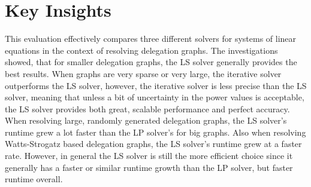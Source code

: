 \section{Key Insights}

This evaluation effectively compares three different solvers for systems of linear equations in the context of resolving delegation graphs. The investigations showed, that for smaller delegation graphs, the LS solver generally provides the best results. When graphs are very sparse or very large, the iterative solver outperforms the LS solver, however, the iterative solver is less precise than the LS solver, meaning that unless a bit of uncertainty in the power values is acceptable, the LS solver provides both great, scalable performance and perfect accuracy. When resolving large, randomly generated delegation graphs, the LS solver's runtime grew a lot faster than the LP solver's for big graphs. Also when resolving Watts-Strogatz based delegation graphs, the LS solver's runtime grew at a faster rate. However, in general the LS solver is still the more efficient choice since it generally has a faster or similar runtime growth than the LP solver, but faster runtime overall. 


